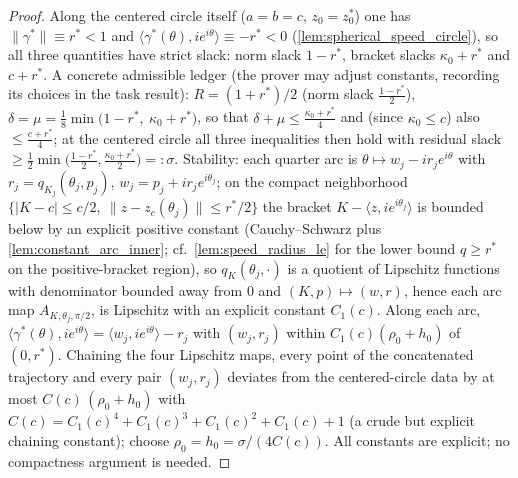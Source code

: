 \begin{proof}
  \leanok
  Along the centered circle itself ($a=b=c$, $z_0=z_0^\ast$) one has
  $\|\gamma^\ast\|\equiv r^\ast<1$ and $\langle \gamma^\ast(\theta),ie^{i\theta}\rangle\equiv
  -r^\ast<0$ (\cref{lem:spherical_speed_circle}), so all three quantities have strict
  slack: norm slack $1-r^\ast$, bracket slacks $\kappa_0+r^\ast$ and $c+r^\ast$. A
  concrete admissible ledger (the prover may adjust constants, recording its choices
  in the task result): $R=(1+r^\ast)/2$ (norm slack $\tfrac{1-r^\ast}{2}$),
  $\delta=\mu=\tfrac18\min\bigl(1-r^\ast,\ \kappa_0+r^\ast\bigr)$, so that
  $\delta+\mu\le\tfrac{\kappa_0+r^\ast}{4}$ and (since $\kappa_0\le c$) also
  $\le\tfrac{c+r^\ast}{4}$; at the centered circle all three inequalities then hold
  with residual slack $\ge\tfrac12\min\bigl(\tfrac{1-r^\ast}{2},
  \tfrac{\kappa_0+r^\ast}{2}\bigr)=:\sigma$. Stability: each quarter arc is
  $\theta\mapsto w_j-i r_j e^{i\theta}$ with $r_j=q_{K_j}(\theta_j,p_j)$,
  $w_j=p_j+i r_j e^{i\theta_j}$; on the compact neighborhood
  $\{|K-c|\le c/2,\ \|z-z_c(\theta_j)\|\le r^\ast/2\}$ the bracket
  $K-\langle z,ie^{i\theta_j}\rangle$ is bounded below by an explicit positive
  constant (Cauchy–Schwarz plus \cref{lem:constant_arc_inner}; cf.\
  \cref{lem:speed_radius_le} for the lower bound $q\ge r^\ast$ on the
  positive-bracket region), so $q_K(\theta_j,\cdot)$ is a quotient of Lipschitz
  functions with denominator bounded away from $0$ and $(K,p)\mapsto(w,r)$, hence each
  arc map $A_{K,\theta_j,\pi/2}$, is Lipschitz with an explicit constant $C_1(c)$.
  Along each arc,
  $\langle \gamma^\ast(\theta),ie^{i\theta}\rangle=\langle w_j,ie^{i\theta}\rangle-r_j$
  with $(w_j,r_j)$ within $C_1(c)(\rho_0+h_0)$ of $(0,r^\ast)$. Chaining the four
  Lipschitz maps, every point of the concatenated trajectory and every pair
  $(w_j,r_j)$ deviates from the centered-circle data by at most
  $C(c)\,(\rho_0+h_0)$ with $C(c)=C_1(c)^4+C_1(c)^3+C_1(c)^2+C_1(c)+1$ (a crude but
  explicit chaining constant); choose $\rho_0=h_0=\sigma/(4C(c))$. All constants are
  explicit; no compactness argument is needed.
\end{proof}

